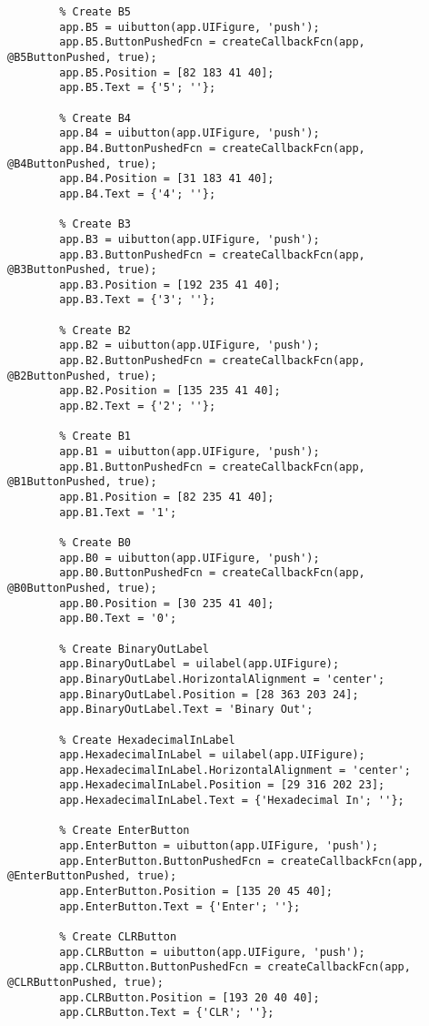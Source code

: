 \documentclass[11pt]{article}
\begin{document}
\begin{verbatim}
	    % Create B5
	    app.B5 = uibutton(app.UIFigure, 'push');
	    app.B5.ButtonPushedFcn = createCallbackFcn(app, @B5ButtonPushed, true);
	    app.B5.Position = [82 183 41 40];
	    app.B5.Text = {'5'; ''};

	    % Create B4
	    app.B4 = uibutton(app.UIFigure, 'push');
	    app.B4.ButtonPushedFcn = createCallbackFcn(app, @B4ButtonPushed, true);
	    app.B4.Position = [31 183 41 40];
	    app.B4.Text = {'4'; ''};

	    % Create B3
	    app.B3 = uibutton(app.UIFigure, 'push');
	    app.B3.ButtonPushedFcn = createCallbackFcn(app, @B3ButtonPushed, true);
	    app.B3.Position = [192 235 41 40];
	    app.B3.Text = {'3'; ''};

	    % Create B2
	    app.B2 = uibutton(app.UIFigure, 'push');
	    app.B2.ButtonPushedFcn = createCallbackFcn(app, @B2ButtonPushed, true);
	    app.B2.Position = [135 235 41 40];
	    app.B2.Text = {'2'; ''};

	    % Create B1
	    app.B1 = uibutton(app.UIFigure, 'push');
	    app.B1.ButtonPushedFcn = createCallbackFcn(app, @B1ButtonPushed, true);
	    app.B1.Position = [82 235 41 40];
	    app.B1.Text = '1';

	    % Create B0
	    app.B0 = uibutton(app.UIFigure, 'push');
	    app.B0.ButtonPushedFcn = createCallbackFcn(app, @B0ButtonPushed, true);
	    app.B0.Position = [30 235 41 40];
	    app.B0.Text = '0';

	    % Create BinaryOutLabel
	    app.BinaryOutLabel = uilabel(app.UIFigure);
	    app.BinaryOutLabel.HorizontalAlignment = 'center';
	    app.BinaryOutLabel.Position = [28 363 203 24];
	    app.BinaryOutLabel.Text = 'Binary Out';

	    % Create HexadecimalInLabel
	    app.HexadecimalInLabel = uilabel(app.UIFigure);
	    app.HexadecimalInLabel.HorizontalAlignment = 'center';
	    app.HexadecimalInLabel.Position = [29 316 202 23];
	    app.HexadecimalInLabel.Text = {'Hexadecimal In'; ''};

	    % Create EnterButton
	    app.EnterButton = uibutton(app.UIFigure, 'push');
	    app.EnterButton.ButtonPushedFcn = createCallbackFcn(app, @EnterButtonPushed, true);
	    app.EnterButton.Position = [135 20 45 40];
	    app.EnterButton.Text = {'Enter'; ''};

	    % Create CLRButton
	    app.CLRButton = uibutton(app.UIFigure, 'push');
	    app.CLRButton.ButtonPushedFcn = createCallbackFcn(app, @CLRButtonPushed, true);
	    app.CLRButton.Position = [193 20 40 40];
	    app.CLRButton.Text = {'CLR'; ''};


\end{verbatim}
\end{document}
